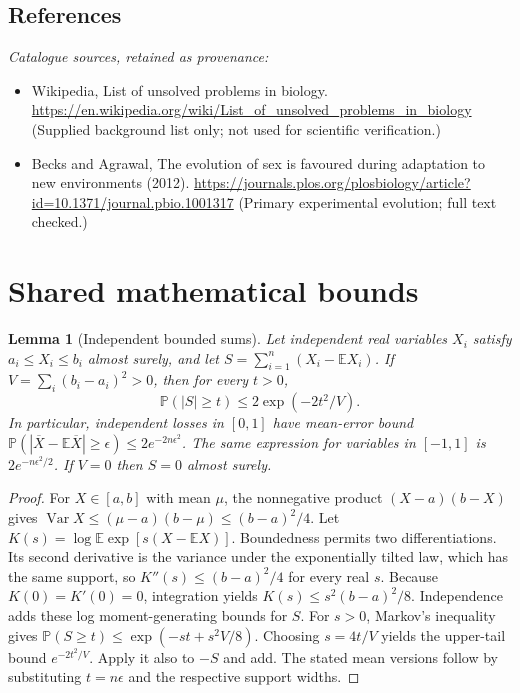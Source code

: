 \documentclass[11pt]{article}
\newcommand{\E}{\mathbb E}
\newcommand{\Prob}{\mathbb P}
\DeclareMathOperator{\Var}{Var}
\providecommand{\E}{\mathbb E}
\providecommand{\Prob}{\mathbb P}
\providecommand{\Var}{\operatorname{Var}}
\newtheorem{sharedlemma}{Lemma}[section]
\begin{document}
\subsection{References}
\noindent\emph{Catalogue sources, retained as provenance:}
\begin{itemize}
\item Wikipedia, List of unsolved problems in biology. \url{https://en.wikipedia.org/wiki/List_of_unsolved_problems_in_biology} (Supplied background list only; not used for scientific verification.)
\item Becks and Agrawal, The evolution of sex is favoured during adaptation to new environments (2012). \url{https://journals.plos.org/plosbiology/article?id=10.1371/journal.pbio.1001317} (Primary experimental evolution; full text checked.)
\end{itemize}
\clearpage


\appendix
\section{Shared mathematical bounds}\label{app:bounds}
\begin{sharedlemma}[Independent bounded sums]\label{lem:bounded}
Let independent real variables $X_i$ satisfy $a_i\leq X_i\leq b_i$ almost surely,
and let $S=\sum_{i=1}^n(X_i-\E X_i)$. If
$V=\sum_i(b_i-a_i)^2>0$, then for every $t>0$,
\[
 \Prob(|S|\geq t)\leq 2\exp(-2t^2/V).
\]
In particular, independent losses in $[0,1]$ have mean-error bound
$\Prob(|\overline X-\E\overline X|\geq\epsilon)
\leq2e^{-2n\epsilon^2}$. The same expression for variables in $[-1,1]$
is $2e^{-n\epsilon^2/2}$. If $V=0$ then $S=0$ almost surely.
\end{sharedlemma}
\begin{proof}
For $X\in[a,b]$ with mean $\mu$, the nonnegative product
$(X-a)(b-X)$ gives
$\Var X\leq(\mu-a)(b-\mu)\leq(b-a)^2/4$.
Let $K(s)=\log\E\exp[s(X-\E X)]$.
Boundedness permits two differentiations. Its second derivative is the variance
under the exponentially tilted law, which has the same support, so
$K''(s)\leq(b-a)^2/4$ for every real $s$.
Because $K(0)=K'(0)=0$, integration yields
$K(s)\leq s^2(b-a)^2/8$.
Independence adds these log moment-generating bounds for $S$.
For $s>0$, Markov's inequality gives
$\Prob(S\geq t)\leq\exp(-st+s^2V/8)$.
Choosing $s=4t/V$ yields the upper-tail bound $e^{-2t^2/V}$.
Apply it also to $-S$ and add. The stated mean versions follow by substituting
$t=n\epsilon$ and the respective support widths.
\end{proof}
\end{document}
